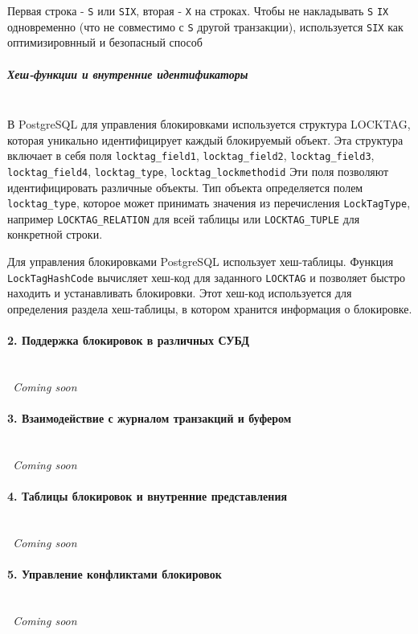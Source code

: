  Первая строка - \texttt{S} или \texttt{SIX}, вторая - \texttt{X} на строках. 
 Чтобы не накладывать \texttt{S} \+ \texttt{IX} одновременно (что не совместимо с \texttt{S} другой транзакции), используется \texttt{SIX} как оптимизировнный и безопасный способ

\subparagraph{Хеш-функции и внутренние идентификаторы} ~\\

 В PostgreSQL для управления блокировками используется структура LOCKTAG, которая уникально идентифицирует каждый блокируемый объект. Эта структура включает в себя поля \texttt{locktag\_field1}, \texttt{locktag\_field2}, \texttt{locktag\_field3}, \texttt{locktag\_field4}, \texttt{locktag\_type}, \texttt{locktag\_lockmethodid} \autocite{PostgreSQLlockh1, PostgreSQLlockh2}
 Эти поля позволяют идентифицировать различные объекты. Тип объекта определяется полем \texttt{locktag\_type}, которое может принимать значения из перечисления \texttt{LockTagType}, например \texttt{LOCKTAG\_RELATION} для всей таблицы или \texttt{LOCKTAG\_TUPLE} для конкретной строки.
 
 Для управления блокировками PostgreSQL использует хеш-таблицы. Функция \texttt{LockTagHashCode} вычисляет хеш-код для заданного \texttt{LOCKTAG} и позволяет быстро находить и устанавливать блокировки. Этот хеш-код используется для определения раздела хеш-таблицы, в котором хранится информация о блокировке. \autocite{PostgreSQLlockc1, PostgreSQLlockc2}

\paragraph{2. Поддержка блокировок в различных СУБД} ~\\
\textit{~Coming soon}

\paragraph{3. Взаимодействие с журналом транзакций и буфером} ~\\
\textit{~Coming soon}

\paragraph{4. Таблицы блокировок и внутренние представления} ~\\
\textit{~Coming soon}

\paragraph{5. Управление конфликтами блокировок} ~\\
\textit{~Coming soon}

